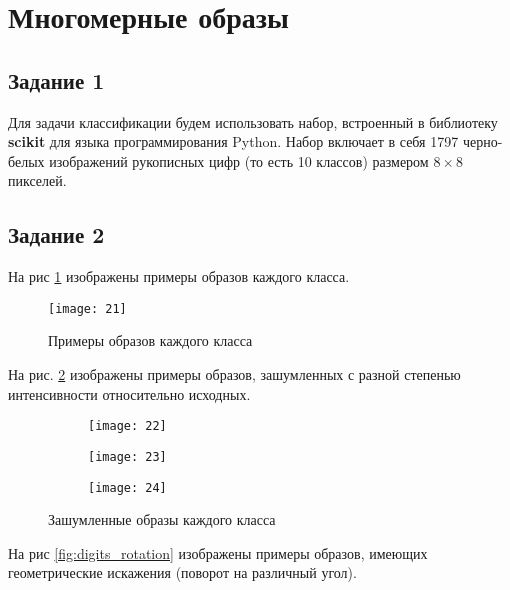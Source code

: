 \newpage

\section{Многомерные образы}

\subsection{Задание 1}

Для задачи классификации будем использовать набор, встроенный в библиотеку \textbf{scikit} для языка программирования Python. Набор включает в себя 1797 черно-белых изображений рукописных цифр (то есть 10 классов) размером $8 \times 8$ пикселей.

\subsection{Задание 2}

На рис \ref{fig:digits} изображены примеры образов каждого класса.

\begin{figure}[H]
\begin{center}
	\texttt{[image: 21]}
	\caption{Примеры образов каждого класса}
	\label{fig:digits}
\end{center}
\end{figure}

На рис. \ref{fig:digits_noise} изображены примеры образов, зашумленных с разной степенью интенсивности относительно исходных.

\begin{figure}[H]
\begin{center}
	\begin{subfigure}[b]{\textwidth}
		\texttt{[image: 22]}
	\end{subfigure}
	\begin{subfigure}[b]{\textwidth}
		\texttt{[image: 23]}
	\end{subfigure}
	\begin{subfigure}[b]{\textwidth}
		\texttt{[image: 24]}
	\end{subfigure}
	\caption{Зашумленные образы каждого класса}
	\label{fig:digits_noise}
\end{center}
\end{figure}

\newpage

На рис \ref{fig:digits_rotation} изображены примеры образов, имеющих геометрические искажения (поворот на различный угол).

